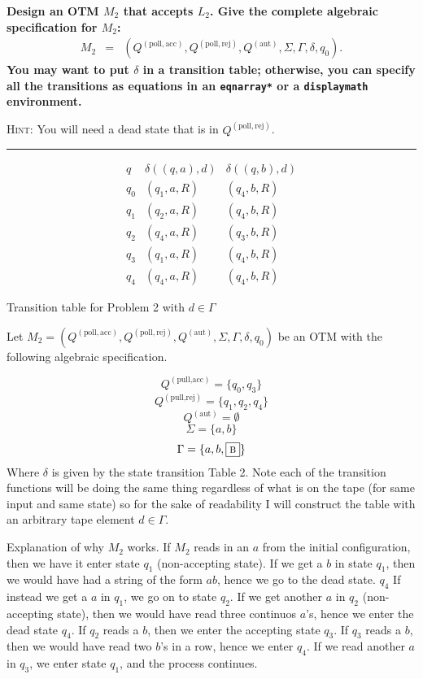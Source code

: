 \documentclass[11pt,twoside]{article}
\newcommand{\solution}{\bigskip\hrule\bigskip}
\newcommand{\Qpollacc}{Q^{\left(\mathrm{poll,acc}\right)}}
\newcommand{\Qpollrej}{Q^{\left(\mathrm{poll,rej}\right)}}
\newcommand{\Qaut}{Q^{\left(\mathrm{aut}\right)}}
\newcommand{\blank}{\ensuremath\fbox{\sc b}}
\begin{document}
{\bfseries
Design an OTM $M_2$
that accepts $L_2$.
Give the complete algebraic specification for $M_2$:
\begin{eqnarray*}
M_2
& = &
(\Qpollacc,\Qpollrej,\Qaut,\Sigma,\Gamma,\delta,q_0).
\end{eqnarray*}
You may want to put $\delta$ in a transition table;
otherwise,
you can specify all the transitions
as equations
in an \verb,eqnarray*, or a \verb,displaymath, environment.

{\normalfont\textsc{Hint:}}
You will need a dead state that is in $\Qpollrej$.

}

\solution

\begin{table}[bp]
    \begin{displaymath}
    \begin{array}{c|cccccc}
    q
    & \delta((q,a),d) & \delta((q,b),d)
    
    \\[2pt]\hline\hline
    q_0
    & (q_1,a,R) & (q_4,b,R)
    \\\hline
    q_1
    & (q_2,a,R) & (q_4,b,R)
    \\\hline
    q_2 & (q_4,a,R) & (q_3,b,R)
    \\\hline
    q_3 &
    (q_1,a,R) & (q_4,b,R)\\\hline
    q_4 & 
    (q_4,a,R) & (q_4,b,R)
    \end{array}
    \end{displaymath}
    \caption{Transition table for Problem 2 with  $d\in \Gamma$}
    \label{table:transition2}
\end{table}
    
Let $M_2=(\Qpollacc,\Qpollrej,\Qaut,\Sigma,\Gamma,\delta,q_0)$ be an OTM with the following algebraic specification. 

\[
    Q^{(\text{pull,acc})}=\{q_0,q_3\}
\]
\[
    Q^{(\text{pull,rej})}=\{q_1,q_2,q_4\}    
\]
\[
\Qaut=\emptyset    
\]
\[
    \Sigma=\{a,b\}
\]
\[
    \Gamma=\{a,b,\blank\}
\]
Where $\delta$ is given by the state transition Table 2. Note each of the transition functions will be doing the same thing regardless of what is on the tape (for same input and same state) so for the sake of readability I will construct the table with an arbitrary tape element $d\in \Gamma$. 

Explanation of why $M_2$  works. If $M_2$ reads in an $a$ from the initial configuration, then we have it enter state $q_1$ (non-accepting state). If we get a $b$ in state $q_1$, then we would have had a string of the form $ab$, hence we go to the dead state. $q_4$ If instead we get a $a$ in $q_1$, we go on to state $q_2$. If we get another $a$ in $q_2$ (non-accepting state), then we would have read three continuos $a$'s, hence we enter the dead state $q_4$. If $q_2$ reads a $b$, then we enter the accepting state $q_3$. If $q_3$ reads a $b$, then we would have read two $b$'s in a row, hence we enter $q_4$. If we read another $a$ in $q_3$, we enter state $q_1$, and the process continues.
\end{document}

